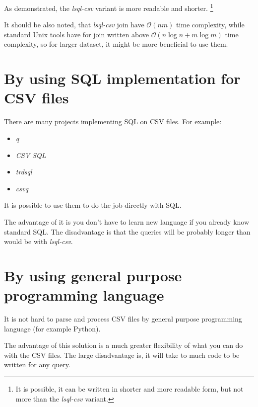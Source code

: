 As demonstrated, the \textit{lsql-csv} variant is more readable and shorter. 
\footnote{It is possible, it can be written in shorter and more readable form, but not more than the \textit{lsql-csv} variant.}

It should be also noted, that \textit{lsql-csv} join have $\mathcal{O}(nm)$ time complexity, while standard Unix tools have for join written above
$\mathcal{O}(n\log n + m\log m)$ time complexity, so for larger dataset, it might be more beneficial to use them.

\section{By using SQL implementation for CSV files}
There are many projects implementing SQL on CSV files. For example:
\begin{itemize}
    \item \textit{q} \cite{q}
    \item \textit{CSV SQL} \cite{csv-sql} 
    \item \textit{trdsql} \cite{trdsql}
    \item \textit{csvq} \cite{csvq}
\end{itemize}

It is possible to use them to do the job directly with SQL. 

The advantage of it is you don't have to learn new language if you already know standard SQL. 
The disadvantage is that the queries will be probably longer than would be with \textit{lsql-csv}.

\section{By using general purpose programming language}
It is not hard to parse and process CSV files by general purpose programming language (for example Python).

The advantage of this solution is a much greater flexibility of what you can do with the CSV files.
The large disadvantage is, it will take to much code to be written for any query.


